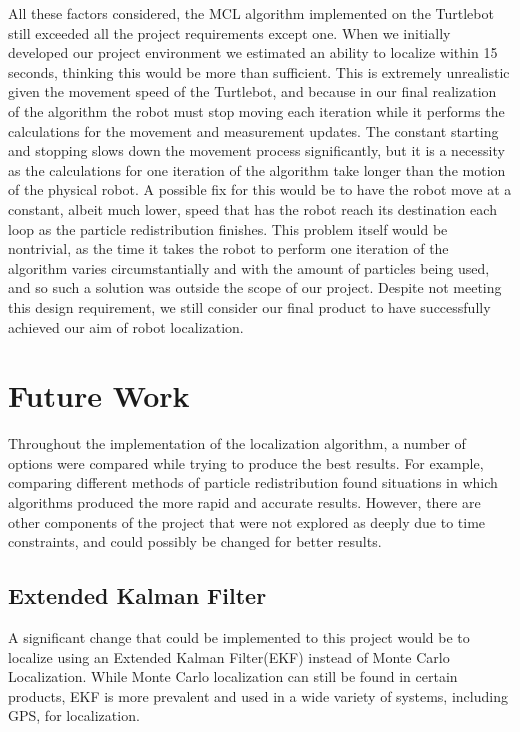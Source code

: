 \documentclass{article}
\newcommand\tab[1][0.5cm]{\hspace*{#1}}
\begin{document}
All these factors considered, the MCL algorithm implemented on the Turtlebot still exceeded all the project requirements except one. When we initially developed our project environment we estimated an ability to localize within 15 seconds, thinking this would be more than sufficient. This is extremely unrealistic given the movement speed of the Turtlebot, and because in our final realization of the algorithm the robot must stop moving each iteration while it performs the calculations for the movement and measurement updates. The constant starting and stopping slows down the movement process significantly, but it is a necessity as the calculations for one iteration of the algorithm take longer than the motion of the physical robot. A possible fix for this would be to have the robot move at a constant, albeit much lower, speed that has the robot reach its destination each loop as the particle redistribution finishes. This problem itself would be nontrivial, as the time it takes the robot to perform one iteration of the algorithm varies circumstantially and with the amount of particles being used, and so such a solution was outside the scope of our project. Despite not meeting this design requirement, we still consider our final product to have successfully achieved our aim of robot localization.\\

\section{Future Work}
\tab Throughout the implementation of the localization algorithm, a number of options were compared while trying to produce the best results. For example, comparing different methods of particle redistribution found situations in which algorithms produced the more rapid and accurate results. However, there are other components of the project that were not explored as deeply due to time constraints, and could possibly be changed for better results.\\

\subsection{Extended Kalman Filter}
\tab A significant change that could be implemented to this project would be to localize using an Extended Kalman Filter(EKF) instead of Monte Carlo Localization. While Monte Carlo localization can still be found in certain products, EKF is more prevalent and used in a wide variety of systems, including GPS, for localization.\\
\end{document}
